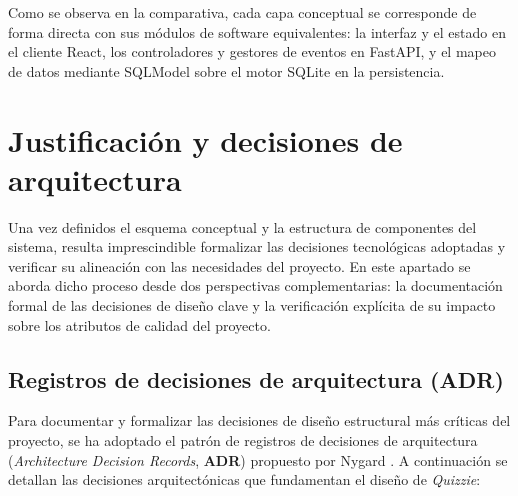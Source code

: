 Como se observa en la comparativa, cada capa conceptual se corresponde de forma directa con sus módulos de software equivalentes: la interfaz y el estado en el cliente React, los controladores y gestores de eventos en FastAPI, y el mapeo de datos mediante SQLModel sobre el motor SQLite en la persistencia.

\section{Justificación y decisiones de arquitectura}\label{sec:justificacion_arquitectura}

Una vez definidos el esquema conceptual y la estructura de componentes del sistema, resulta imprescindible formalizar las decisiones tecnológicas adoptadas y verificar su alineación con las necesidades del proyecto. En este apartado se aborda dicho proceso desde dos perspectivas complementarias: la documentación formal de las decisiones de diseño clave y la verificación explícita de su impacto sobre los atributos de calidad del proyecto.

\subsection{Registros de decisiones de arquitectura (ADR)}\label{subsec:adrs}

Para documentar y formalizar las decisiones de diseño estructural más críticas del proyecto, se ha adoptado el patrón de registros de decisiones de arquitectura (\textit{Architecture Decision Records}, \textbf{ADR}) propuesto por Nygard \cite{nygard2011adr}. A continuación se detallan las decisiones arquitectónicas que fundamentan el diseño de \textit{Quizzie}:

